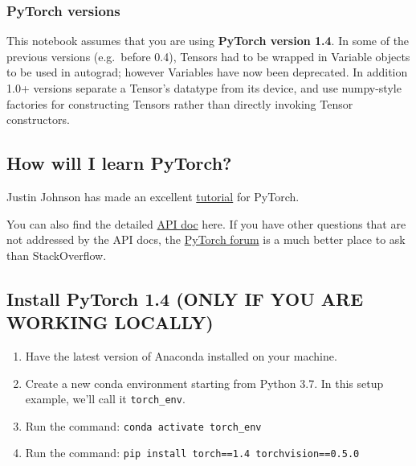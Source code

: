 \documentclass[11pt]{article}
\providecommand{\tightlist}{%
      \setlength{\itemsep}{0pt}\setlength{\parskip}{0pt}}
\begin{document}
\hypertarget{pytorch-versions}{%
\subsubsection{PyTorch versions}\label{pytorch-versions}}

This notebook assumes that you are using \textbf{PyTorch version 1.4}.
In some of the previous versions (e.g.~before 0.4), Tensors had to be
wrapped in Variable objects to be used in autograd; however Variables
have now been deprecated. In addition 1.0+ versions separate a Tensor's
datatype from its device, and use numpy-style factories for constructing
Tensors rather than directly invoking Tensor constructors.

    \hypertarget{how-will-i-learn-pytorch}{%
\subsection{How will I learn PyTorch?}\label{how-will-i-learn-pytorch}}

Justin Johnson has made an excellent
\href{https://github.com/jcjohnson/pytorch-examples}{tutorial} for
PyTorch.

You can also find the detailed
\href{http://pytorch.org/docs/stable/index.html}{API doc} here. If you
have other questions that are not addressed by the API docs, the
\href{https://discuss.pytorch.org/}{PyTorch forum} is a much better
place to ask than StackOverflow.

\hypertarget{install-pytorch-1.4-only-if-you-are-working-locally}{%
\subsection{Install PyTorch 1.4 (ONLY IF YOU ARE WORKING
LOCALLY)}\label{install-pytorch-1.4-only-if-you-are-working-locally}}

\begin{enumerate}
\def\labelenumi{\arabic{enumi}.}
\tightlist
\item
  Have the latest version of Anaconda installed on your machine.
\item
  Create a new conda environment starting from Python 3.7. In this setup
  example, we'll call it \texttt{torch\_env}.
\item
  Run the command: \texttt{conda\ activate\ torch\_env}
\item
  Run the command: \texttt{pip\ install\ torch==1.4\ torchvision==0.5.0}
\end{enumerate}
\end{document}
